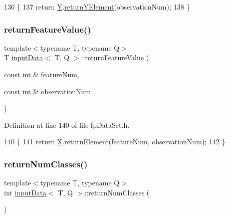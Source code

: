 \begin{DoxyCode}
136                                                                     \{
137             \textcolor{keywordflow}{return} \hyperlink{classinputData_a03b936fe0070cee08153cb4853003ab4}{Y}.\hyperlink{classinputYData_affffd6432eaa11acc46fc83fb4ce409a}{returnYElement}(observationNum);
138         \}
\end{DoxyCode}
\mbox{\label{classinputData_a8914408ce5de02c3786dc7ff61f6cfab}} 
\subsubsection{\texorpdfstring{return\+Feature\+Value()}{returnFeatureValue()}}
{\footnotesize\ttfamily template$<$typename T, typename Q$>$ \\
T \hyperlink{classinputData}{input\+Data}$<$ T, Q $>$\+::return\+Feature\+Value (\begin{DoxyParamCaption}\item[{const int \&}]{feature\+Num,  }\item[{const int \&}]{observation\+Num }\end{DoxyParamCaption})\hspace{0.3cm}{\ttfamily [inline]}}



Definition at line 140 of file fp\+Data\+Set.\+h.


\begin{DoxyCode}
140                                                                                      \{
141             \textcolor{keywordflow}{return} \hyperlink{classinputData_a31bffca53fea1a24c237e543cc5489a0}{X}.returnElement(featureNum, observationNum);
142         \}
\end{DoxyCode}
\mbox{\label{classinputData_aa87e9181995fe0f15fae83617dba2808}} 
\subsubsection{\texorpdfstring{return\+Num\+Classes()}{returnNumClasses()}}
{\footnotesize\ttfamily template$<$typename T, typename Q$>$ \\
int \hyperlink{classinputData}{input\+Data}$<$ T, Q $>$\+::return\+Num\+Classes (\begin{DoxyParamCaption}{ }\end{DoxyParamCaption})\hspace{0.3cm}{\ttfamily [inline]}}




